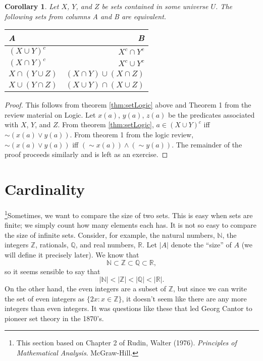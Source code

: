 \documentclass[12pt,reqno]{amsart}
\newtheorem{corollary}{Corollary}[section]
\theoremstyle{definition}
\begin{document}
\begin{corollary}
  Let $X$, $Y$, and $Z$ be sets contained in some universe $U$. 
  The following sets from columns A and B are equivalent.
  \begin{centering}
    \begin{tabular}{l r}
      A       & B \\ \hline
      $(X \cup Y)^c$ & $X^c \cap Y^c$ \\
      $(X \cap Y)^c$ & $X^c \cup Y^c$ \\
      $X \cap (Y \cup Z)$ & $(X \cap Y) \cup (X \cap Z)$ \\
      $X \cup (Y \cap Z)$ & $(X \cup Y) \cap (X \cup Z)$
    \end{tabular}
  \end{centering}
\end{corollary}
\begin{proof}
  This follows from theorem \ref{thm:setLogic} above and Theorem 1
  from the review material on Logic. Let $x(a)$, $y(a)$, $z(a)$ be the
  predicates associated with $X$, $Y$, and $Z$. From theorem
  \ref{thm:setLogic}, $a \in (X \cup Y)^c$ iff $\sim(x(a) \vee
  y(a))$. From theorem 1 from the logic review, $\sim(x(a) \vee y(a))$
  iff $(\sim x(a) ) \wedge (\sim y(a))$. The remainder of the proof
  proceeds similarly and is left as an exercise.
\end{proof}

\section{Cardinality \label{s:card}}

\footnote{This section based on Chapter 2 of Rudin, Walter
  (1976). \textit{Principles of Mathematical
    Analysis}. McGraw-Hill.}Sometimes, we want to compare the size of
two sets. This is easy when sets are finite; we simply count how many
elements each has. It is not so easy to compare the size of infinite
sets. Consider, for example, the natural numbers, $\mathbb{N}$, the
integers $\mathbb{Z}$, rationals, $\mathbb{Q}$, and real numbers,
$\mathbb{R}$. Let $|A|$ denote the ``size'' of $A$ (we will define it
precisely later). We know that
\[ \mathbb{N} \subset \mathbb{Z} \subset \mathbb{Q} \subset
\mathbb{R}, \]
so it seems sensible to say that 
\[ |\mathbb{N}| < |\mathbb{Z}| < |\mathbb{Q}| < |\mathbb{R}|. \] 
On the other hand, the even integers are a subset of $\mathbb{Z}$, but
since we can write the set of even integers as $\{2x: x \in \mathbb{Z}
\}$, it doesn't seem like there are any more integers than even
integers. It was questions like these that led Georg Cantor to pioneer
set theory in the 1870's. 
\end{document}
